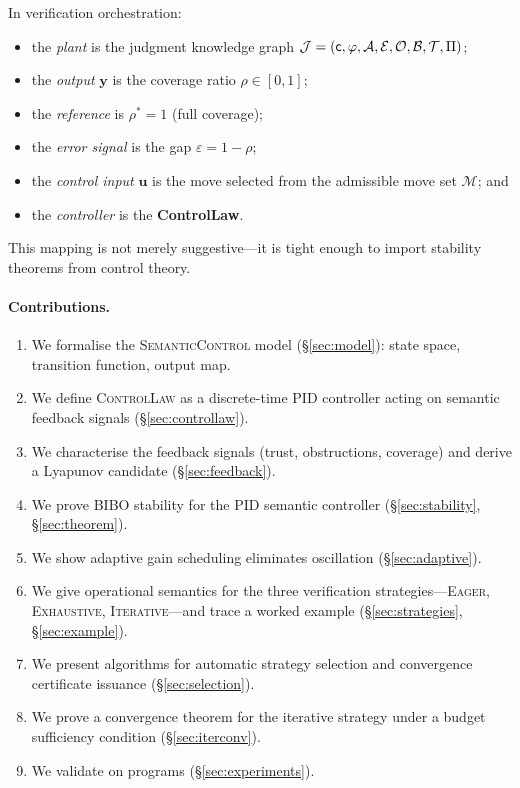 \documentclass[11pt]{article}
\newcommand{\uctrl}{\mathbf{u}}            %
\newcommand{\yout}{\mathbf{y}}             %
\newcommand{\vcov}{\rho}                   %
\newcommand{\vgap}{\varepsilon}            %
\newcommand{\setpoint}{\rho^*}             %
\newcommand{\moves}{\mathcal{M}}           %
\begin{document}
In verification orchestration:
\begin{itemize}
  \item the \emph{plant} is the judgment knowledge graph
        $\mathcal{J} = (\mathsf{c},\varphi,\mathcal{A},\mathcal{E},\mathcal{O},\mathcal{B},\mathcal{T},\Pi)$;
  \item the \emph{output} $\yout$ is the coverage ratio $\vcov \in [0,1]$;
  \item the \emph{reference} is $\setpoint = 1$ (full coverage);
  \item the \emph{error signal} is the gap $\vgap = 1 - \vcov$;
  \item the \emph{control input} $\uctrl$ is the move selected from the
        admissible move set $\moves$; and
  \item the \emph{controller} is the \textbf{ControlLaw}.
\end{itemize}
This mapping is not merely suggestive---it is tight enough to import
stability theorems from control theory.

\paragraph{Contributions.}
\begin{enumerate}
  \item We formalise the \textsc{SemanticControl} model
        (\S\ref{sec:model}): state space, transition function, output map.
  \item We define \textsc{ControlLaw} as a discrete-time PID controller
        acting on semantic feedback signals (\S\ref{sec:controllaw}).
  \item We characterise the feedback signals (trust, obstructions,
        coverage) and derive a Lyapunov candidate
        (\S\ref{sec:feedback}).
  \item We prove BIBO stability for the PID semantic controller
        (\S\ref{sec:stability}, \S\ref{sec:theorem}).
  \item We show adaptive gain scheduling eliminates oscillation
        (\S\ref{sec:adaptive}).
  \item We give operational semantics for the three verification
        strategies---\textsc{Eager}, \textsc{Exhaustive},
        \textsc{Iterative}---and trace a worked example
        (\S\ref{sec:strategies}, \S\ref{sec:example}).
  \item We present algorithms for automatic strategy selection and
        convergence certificate issuance (\S\ref{sec:selection}).
  \item We prove a convergence theorem for the iterative strategy
        under a budget sufficiency condition (\S\ref{sec:iterconv}).
  \item We validate on \numcases{} programs (\S\ref{sec:experiments}).
\end{enumerate}
\end{document}
